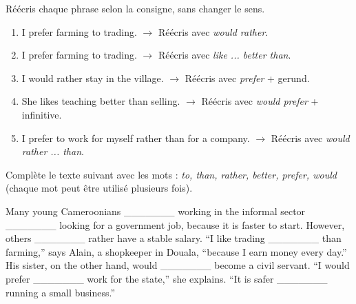 \documentclass[11pt]{article}
\begin{document}
\begin{exercice}
Réécris chaque phrase selon la consigne, sans changer le sens.
\begin{enumerate}
\item I prefer farming to trading. $\rightarrow$ Réécris avec \emph{would rather}.
\item I prefer farming to trading. $\rightarrow$ Réécris avec \emph{like ... better than}.
\item I would rather stay in the village. $\rightarrow$ Réécris avec \emph{prefer} + gerund.
\item She likes teaching better than selling. $\rightarrow$ Réécris avec \emph{would prefer} + infinitive.
\item I prefer to work for myself rather than for a company. $\rightarrow$ Réécris avec \emph{would rather ... than}.
\end{enumerate}
\end{exercice}

\begin{exercice}
Complète le texte suivant avec les mots : \emph{to, than, rather, better, prefer, would} (chaque mot peut être utilisé plusieurs fois).
\begin{textebox}
Many young Cameroonians \_\_\_\_\_\_\_ working in the informal sector \_\_\_\_\_\_\_ looking for a government job, because it is faster to start. However, others \_\_\_\_\_\_\_ rather have a stable salary. “I like trading \_\_\_\_\_\_\_ than farming,” says Alain, a shopkeeper in Douala, “because I earn money every day.” His sister, on the other hand, would \_\_\_\_\_\_\_ become a civil servant. “I would prefer \_\_\_\_\_\_\_ work for the state,” she explains. “It is safer \_\_\_\_\_\_\_ running a small business.”
\end{textebox}
\end{exercice}
\end{document}
